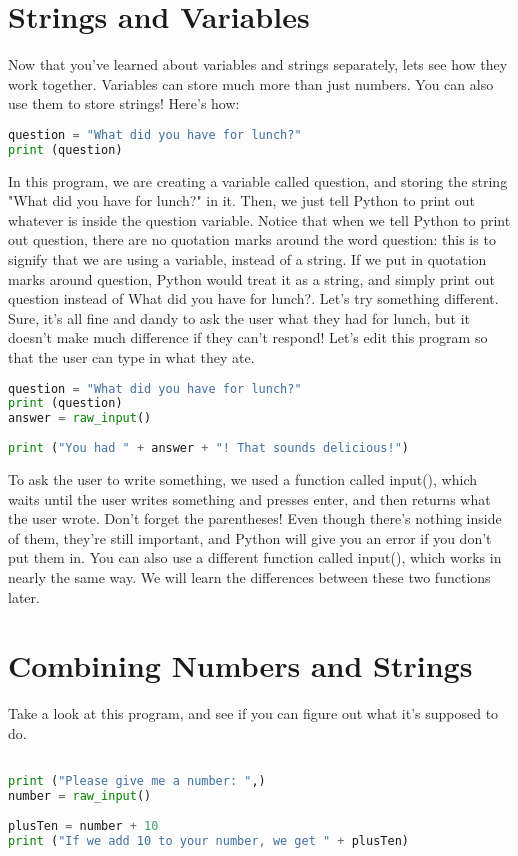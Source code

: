 \section{Strings and Variables}
Now that you've learned about variables and strings separately, lets see how
they work together.  Variables can store much more than just numbers. You can
also use them to store strings! Here's how:
\lstset{basicstyle=\scriptsize, numbers=left, captionpos=b, tabsize=4}
\begin{lstlisting}[caption=String 7,language={Python},
xleftmargin=15pt, label=lst:string7]
question = "What did you have for lunch?"
print (question)
\end{lstlisting}
In this program, we are creating a variable called question, and storing the
string "What did you have for lunch?" in it. Then, we just tell Python to print
out whatever is inside the question variable. Notice that when we tell Python to
print out question, there are no quotation marks around the word question: this
is to signify that we are using a variable, instead of a string. If we put in
quotation marks around question, Python would treat it as a string, and simply
print out question instead of What did you have for lunch?.  Let's try something
different. Sure, it's all fine and dandy to ask the user what they had for
lunch, but it doesn't make much difference if they can't respond! Let's edit
this program so that the user can type in what they ate.
\lstset{basicstyle=\scriptsize, numbers=left, captionpos=b, tabsize=4}
\begin{lstlisting}[caption=String 8,language={Python},
xleftmargin=15pt, label=lst:string8]
question = "What did you have for lunch?"
print (question)
answer = raw_input()
 
print ("You had " + answer + "! That sounds delicious!")
\end{lstlisting}

To ask the user to write something, we used a function called input(), which
waits until the user writes something and presses enter, and then returns what
the user wrote. Don't forget the parentheses! Even though there's nothing inside
of them, they're still important, and Python will give you an error if you don't
put them in. You can also use a different function called input(), which works
in nearly the same way. We will learn the differences between these two
functions later.

\section{Combining Numbers and Strings}
Take a look at this program, and see if you can figure out what it's supposed to do.
\lstset{basicstyle=\scriptsize, numbers=left, captionpos=b, tabsize=4}
\begin{lstlisting}[caption=String 9,language={Python},
xleftmargin=15pt, label=lst:string9]

print ("Please give me a number: ",)
number = raw_input()
 
plusTen = number + 10
print ("If we add 10 to your number, we get " + plusTen)
\end{lstlisting}

